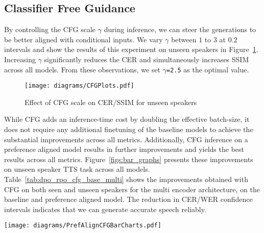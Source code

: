 \subsection{Classifier Free Guidance}
By controlling the CFG scale $\gamma$ during inference, we can steer the generations to be better aligned with conditional inputs.
We vary $\gamma$ between $1$ to $3$ at $0.2$ intervals and show the results of this experiment on unseen speakers in Figure~\ref{figs:cfgplots}. 
Increasing $\gamma$ significantly reduces the CER and simultaneously increases SSIM across all models. 
From these observations, we set $\gamma$\texttt{=2.5} as the optimal value. 

\vspace{-2mm} 
\begin{figure}[!ht]
    \centering
    \texttt{[image: diagrams/CFGPlots.pdf]}
    \vspace{-8mm} 
    \caption{Effect of CFG scale on CER/SSIM for unseen speakers}
    \label{figs:cfgplots}
\end{figure}

While CFG adds an inference-time cost by doubling the effective batch-size, it does not require any additional finetuning of the baseline models to achieve the substantial improvements across all metrics. 
Additionally, CFG inference on a preference aligned model results in further improvements and yields the best results across all metrics.
Figure~\ref{figs:bar_graphs} presents these improvements on unseen speaker TTS task across all models. Table~\ref{tab:dpo_rpo_cfg_base_multi} shows the improvements obtained with CFG on both seen and unseen speakers for the multi encoder architecture, on the baseline and preference aligned model. 
The reduction in CER/WER confidence intervals indicates that we can generate accurate speech reliably.

\begin{figure*}[tp]
    \centering
    \texttt{[image: diagrams/PrefAlignCFGBarCharts.pdf]}
\vspace{-4mm}    
    \caption{Performance of Koel-TTS Architectures. \textbf{Left:} 
    Intelligibility (CER) and speaker similarity (SSIM) evaluations of base and preference-aligned (RPO) Koel-TTS architectures, with and without CFG, on zero-shot TTS. \textbf{Right:} Equivalent evaluations for a \textit{Decoder Context} multilingual TTS model across various languages and text tokenizers. Both CFG and preference alignment, independently and in combination (green), improve CER and SSIM over the base model (gray).
    }
\vspace{-4mm}
    \label{figs:bar_graphs}
\end{figure*}


